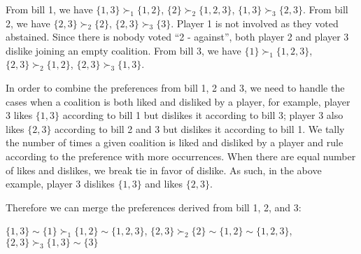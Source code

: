 From bill 1, we have $\{1, 3\} \succ_1 \{1, 2\}$, $\{2\} \succ_2 \{1, 2, 3\}$,
$\{1, 3\} \succ_3 \{2, 3\}$.
From bill 2, we have $\{2, 3\} \succ_2 \{2\}$, $\{2, 3\} \succ_3 \{3\}$.
Player 1 is not involved as they voted abstained.
Since there is nobody voted ``2 - against'', both player 2 and player 3 dislike
joining an empty coalition.
From bill 3, we have $\{1\} \succ_1 \{1, 2, 3\}$, $\{2, 3\} \succ_2 \{1, 2\}$,
$\{2, 3\} \succ_3 \{1, 3\}$.

In order to combine the preferences from bill 1, 2 and 3, we need to handle
the cases when a coalition is both liked and disliked by a player, for example,
player 3 likes $\{1, 3\}$ according to bill 1 but dislikes it according to bill 3;
player 3 also likes $\{2, 3\}$ according to bill 2 and 3 but dislikes it according to bill 1.
We tally the number of times a given coalition is liked and disliked by a player and
rule according to the preference with more occurrences. When there are equal number of
likes and dislikes, we break tie in favor of dislike.
As such, in the above example, player 3 dislikes $\{1, 3\}$ and likes $\{2, 3\}$.

Therefore we can merge the preferences derived from bill 1, 2, and 3:

$\{1, 3\} \sim \{1\} \succ_1 \{1, 2\} \sim \{1, 2, 3\}$,
$\{2, 3\} \succ_2 \{2\} \sim \{1, 2\} \sim \{1, 2, 3\}$,
$\{2, 3\} \succ_3 \{1, 3\} \sim \{3\}$

